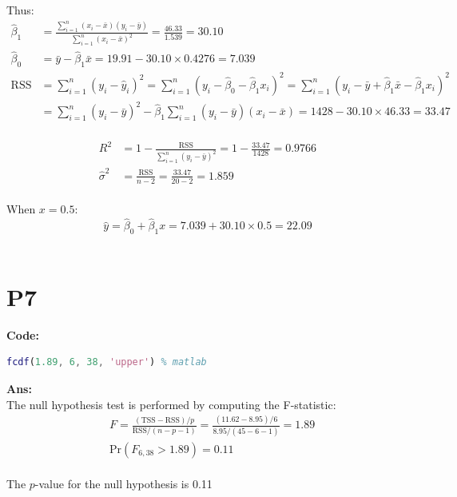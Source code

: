 \documentclass[twoside]{homework}
\begin{document}
Thus:\\
\begin{equation}
    \begin{aligned}
    \hat{\beta}_1 &= \frac{\sum_{i=1}^n (x_i-\bar{x})(y_i-\bar{y})}{\sum_{i=1}^n (x_i-\bar{x})^2} = \frac{46.33}{1.539} = 30.10\\
    \hat{\beta}_0 &= \bar{y} - \hat{\beta}_1\bar{x} = 19.91 - 30.10\times 0.4276 = 7.039\\
    \mathrm{RSS} &= \sum_{i=1}^n (y_i-\hat{y}_i)^2 = \sum_{i=1}^n (y_i - \hat{\beta}_0 - \hat{\beta}_1 x_i)^2 = \sum_{i=1}^n (y_i - \bar{y} + \hat{\beta}_1 \bar{x} - \hat{\beta}_1 x_i)^2 \\
    &= \sum_{i=1}^n (y_i - \bar{y})^2 - \hat{\beta}_1 \sum_{i=1}^n (y_i - \bar{y}) (x_i - \bar{x}) = 1428 - 30.10\times 46.33 = 33.47
    \end{aligned}
\end{equation}{}\\
\begin{equation}
\begin{aligned}
R^2 &= 1 - \frac{\mathrm{RSS}}{\sum_{i=1}^n (y_i-\bar{y})^2} = 1-\frac{33.47}{1428} = 0.9766\\
\hat{\sigma}^2 &= \frac{\mathrm{RSS}}{n-2}  = \frac{\mathrm{33.47}}{20-2} = 1.859
\end{aligned}
\end{equation}{}\\

When $x = 0.5$:\\
$$\hat{y} = \hat{\beta}_0 + \hat{\beta}_1 x = 7.039 + 30.10\times 0.5 = 22.09$$\\



\newpage

\section*{P7}
\textbf{Code:}
\begin{lstlisting}[language=Matlab]
fcdf(1.89, 6, 38, 'upper') % matlab
\end{lstlisting}{}
\textbf{Ans:}\\
The null hypothesis test is performed by computing the F-statistic:\\
\begin{equation}
\begin{aligned}
&F = \frac{(\mathrm{TSS}-\mathrm{RSS})/p}{\mathrm{RSS}/(n-p-1)} = \frac{(11.62-8.95)/6}{8.95/(45-6-1)} = 1.89\\
&\mathrm{Pr} (F_{6,38} > 1.89) = 0.11
\end{aligned}
\end{equation}{}\\
The $p$-value for the null hypothesis is 0.11
\end{document}
